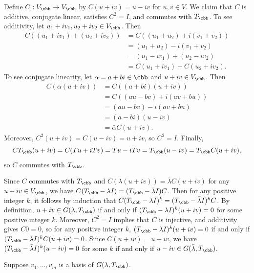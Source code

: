 \begin{sol}
    Define $C : V_{\cbb} \to V_{\cbb}$ by $C(u + iv) = u - iv$ for $u, v \in V$.
    We claim that $C$ is additive, conjugate linear, satisfies $C^2 = I$, and commutes with $T_{\cbb}$.
    To see additivity, let $u_1 + iv_1, u_2 + iv_2 \in V_{\cbb}$. Then
    \begin{align*}
        C((u_1 + iv_1) + (u_2 + iv_2)) &= C((u_1 + u_2) + i(v_1 + v_2)) \\
        &= (u_1 + u_2) - i(v_1 + v_2) \\
        &= (u_1 - iv_1) + (u_2 - iv_2) \\
        &= C(u_1 + iv_1) + C(u_2 + iv_2).
    \end{align*}
    To see conjugate linearity, let $\alpha = a + bi \in \cbb$ and $u + iv \in V_{\cbb}$. Then
    \begin{align*}
        C(\alpha(u + iv)) &= C((a + bi)(u + iv)) \\
        &= C((au - bv) + i(av + bu)) \\
        &= (au - bv) - i(av + bu) \\
        &= (a - bi)(u - iv) \\
        &= \bar\alpha C(u + iv).
    \end{align*}
    Moreover, $C^2(u + iv) = C(u - iv) = u + iv$, so $C^2 = I$.
    Finally,
    \[
        C T_{\cbb}(u + iv) = C(Tu + iTv) = Tu - iTv = T_{\cbb}(u - iv) = T_{\cbb} C(u + iv),
    \]
    so $C$ commutes with $T_{\cbb}$.
    \begin{subexercises}
        \item Since $C$ commutes with $T_{\cbb}$ and $C(\lambda(u + iv)) = \bar{\lambda} C(u + iv)$ for any $u + iv \in V_{\cbb}$, we have $C(T_{\cbb} - \lambda I) = (T_{\cbb} - \bar{\lambda} I) C$.
        Then for any positive integer $k$, it follows by induction that $C(T_{\cbb} - \lambda I)^k = (T_{\cbb} - \bar{\lambda} I)^k C$.
        By definition, $u + iv \in G(\lambda, T_{\cbb})$ if and only if $(T_{\cbb} - \lambda I)^k (u + iv) = 0$ for some positive integer $k$.
        Moreover, $C^2 = I$ implies that $C$ is injective, and additivity gives $C0 = 0$, so for any positive integer $k$, $(T_{\cbb} - \lambda I)^k (u + iv) = 0$ if and only if $(T_{\cbb} - \bar{\lambda} I)^k C(u + iv) = 0$.
        Since $C(u + iv) = u - iv$, we have $(T_{\cbb} - \bar{\lambda} I)^k (u - iv) = 0$ for some $k$ if and only if $u - iv \in G(\bar{\lambda}, T_{\cbb})$.
        \item Suppose $v_1, \ldots, v_m$ is a basis of $G(\lambda, T_{\cbb})$.

\end{subexercises}
\end{sol}
